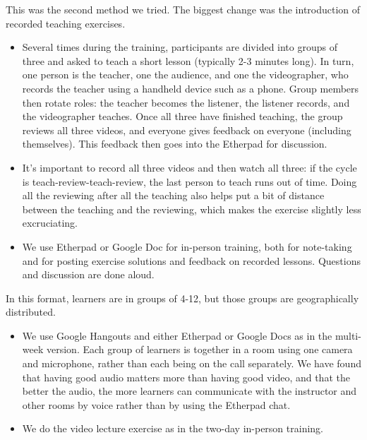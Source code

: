 
This was the second method we tried. The biggest change was the
introduction of recorded teaching exercises.

\begin{itemize}

\item
  Several times during the training, participants are divided into
  groups of three and asked to teach a short lesson (typically 2-3
  minutes long). In turn, one person is the teacher, one the audience,
  and one the videographer, who records the teacher using a handheld
  device such as a phone. Group members then rotate roles: the teacher
  becomes the listener, the listener records, and the videographer
  teaches. Once all three have finished teaching, the group reviews
  all three videos, and everyone gives feedback on everyone (including
  themselves). This feedback then goes into the Etherpad for
  discussion.

\item
  It's important to record all three videos and then watch all three:
  if the cycle is teach-review-teach-review, the last person to teach
  runs out of time. Doing all the reviewing after all the teaching
  also helps put a bit of distance between the teaching and the
  reviewing, which makes the exercise slightly less excruciating.

\item
  We use Etherpad or Google Doc for in-person training, both for
  note-taking and for posting exercise solutions and feedback on
  recorded lessons.  Questions and discussion are done aloud.

\end{itemize}


In this format, learners are in groups of 4-12, but those groups are
geographically distributed.

\begin{itemize}

\item
  We use Google Hangouts and either Etherpad or Google Docs as in the
  multi-week version. Each group of learners is together in a room
  using one camera and microphone, rather than each being on the call
  separately. We have found that having good audio matters more than
  having good video, and that the better the audio, the more learners
  can communicate with the instructor and other rooms by voice rather
  than by using the Etherpad chat.

\item
  We do the video lecture exercise as in the two-day in-person training.

\end{itemize}

